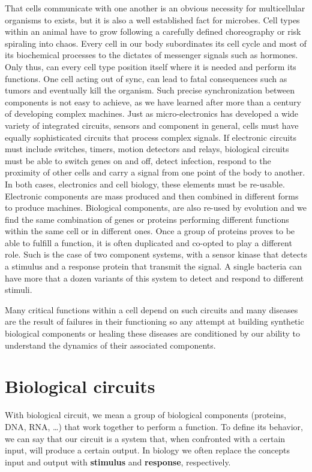 That cells communicate with one another is an obvious necessity for multicellular organisms to exists, but it is also a well established fact for microbes. Cell types within an animal have to grow following a carefully defined choreography or risk spiraling into chaos. Every cell in our body  subordinates its cell cycle and most of its biochemical  processes to the dictates of messenger signals such as hormones. Only thus, can every cell type position itself where it is needed and perform its functions. One cell acting out of sync, can lead to fatal consequences such as tumors and eventually kill the organism. Such precise synchronization between components is not easy to achieve, as we have learned after more than a century of developing complex machines. Just as micro-electronics has developed a wide variety of integrated circuits, sensors and component in general, cells must have equally sophisticated circuits that process complex signals. If electronic circuits must include switches, timers, motion detectors and relays, biological circuits must be able to switch genes on and off, detect infection, respond to the proximity of other cells and carry a signal from one point of the body to another. In both cases, electronics and cell biology, these elements must be re-usable. Electronic components are mass produced and then combined in different forms to produce machines. Biological components, are also re-used by evolution and we find the same combination of genes or proteins performing different functions within the same cell or in different ones. Once a group of proteins proves to be able to fulfill a function, it is often duplicated and co-opted to play a different role. Such is the case of two component systems, with a sensor kinase that detects a stimulus and a response protein that transmit the signal. A single bacteria can have more that a dozen variants of this system to detect and respond to different stimuli.

Many critical functions within a cell depend on such circuits and many diseases are the result of failures in their functioning so any attempt at building synthetic biological components or healing these diseases are conditioned by our ability to understand the dynamics of their associated components.

\section{Biological circuits}

With biological circuit, we mean a group of biological components (proteins, DNA, RNA, \dots ) that work together to perform a function. To define its behavior, we can say that our circuit is a system that, when confronted with a certain input, will produce a certain output. In biology we often replace the concepts input and output with \textbf{stimulus} and \textbf{response}, respectively.

